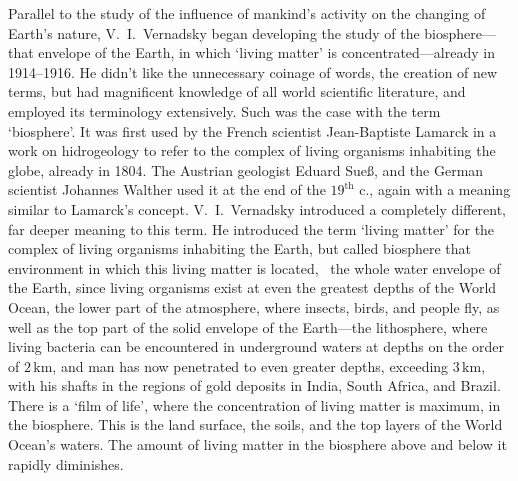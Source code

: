 Parallel to the study of the influence of mankind's activity on the changing of
Earth's nature, V.~I.\ Vernadsky began developing the study of the
biosphere---that envelope of the Earth, in which `living matter' is
concentrated---already in 1914--1916.  He didn't like the unnecessary coinage
of words, the creation of new terms, but had magnificent knowledge of all world
scientific literature, and employed its terminology extensively.  Such was the
case with the term `biosphere'.  It was first used by the French scientist
Jean-Baptiste Lamarck in a work on hidrogeology to refer to the complex of living organisms
inhabiting the globe, already in 1804.  The Austrian geologist Eduard Sueß, and the German
scientist Johannes Walther used it at the end of the
$19^\mathrm{th}$ c., again with a meaning similar to Lamarck's concept.  V.~I.\ 
Vernadsky introduced a completely different, far deeper meaning to this term.
He introduced the term `living matter' for the complex of living organisms
inhabiting the Earth, but called biosphere that environment in which this
living matter is located, \ie\ the whole water envelope of the Earth, since
living organisms exist at even the greatest depths of the World Ocean, the
lower part of the atmosphere, where insects, birds, and people fly, as well as
the top part of the solid envelope of the Earth---the lithosphere, where living
bacteria can be encountered in underground waters at depths on the order of
$2\,\mathrm{km}$, and man has now penetrated to even greater depths, exceeding
$3\,\mathrm{km}$, with his shafts in the regions of gold deposits in India,
South Africa, and Brazil.  There is a `film of life',
where the concentration of living matter is maximum, in the biosphere.  This is
the land surface, the soils, and the top layers of the World Ocean's waters.
The amount of living matter in the biosphere above and below it rapidly
diminishes.

